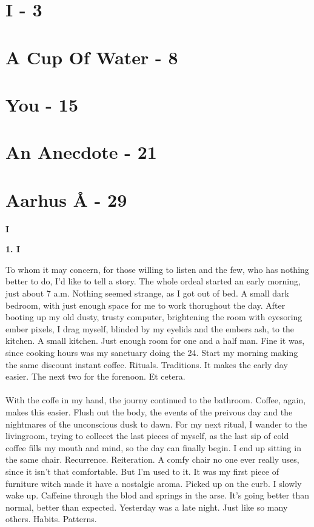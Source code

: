 \documentclass[]{article}
\begin{document}
\section{I - 3}

\section{A Cup Of Water - 8}

\section{You - 15}

\section{An Anecdote - 21}

\section{Aarhus Å - 29}

\newpage

\begin{center}
	\Large\textbf{I}
\end{center}

\begin{center}
	\large\textbf{1. I}
\end{center}

To whom it may concern, for those willing to listen and the few, who has nothing better to do, I'd like to tell a story. The whole ordeal started an early morning, just about 7 a.m. Nothing seemed strange, as I got out of bed. A small dark bedroom, with just enough space for me to work thorughout the day. After booting up my old dusty, trusty computer, brightening the room with eyesoring ember pixels, I drag myself, blinded by my eyelids and the embers ash, to the kitchen. A small kitchen. Just enough room for one and a half man. Fine it was, since cooking hours was my sanctuary doing the 24. Start my morning making the same discount instant coffee. Rituals. Traditions. It makes the early day easier. The next two for the forenoon. Et cetera. 
\\ \\ 
With the coffe in my hand, the journy continued to the bathroom. Coffee, again, makes this easier. Flush out the body, the events of the preivous day and the nightmares of the unconscious dusk to dawn. For my next ritual, I wander to the livingroom, trying to collecet the last pieces of myself, as the last sip of cold coffee fills my mouth and mind, so the day can finally begin. I end up sitting in the same chair. Recurrence. Reiteration. A comfy chair no one ever really uses, since it isn't that comfortable. But I'm used to it. It was my first piece of furniture witch made it have a nostalgic aroma. Picked up on the curb. I slowly wake up. Caffeine through the blod and springs in the arse. It's going better than normal, better than expected. Yesterday was a late night. Just like so many others. Habits. Patterns.
\end{document}
